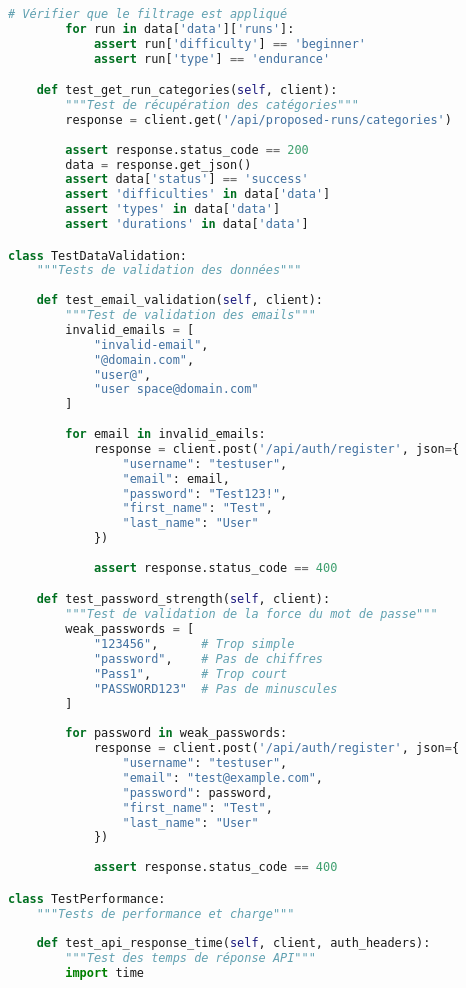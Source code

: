 \begin{lstlisting}[language=python, caption=Suite de tests API complète]
        # Vérifier que le filtrage est appliqué
        for run in data['data']['runs']:
            assert run['difficulty'] == 'beginner'
            assert run['type'] == 'endurance'

    def test_get_run_categories(self, client):
        """Test de récupération des catégories"""
        response = client.get('/api/proposed-runs/categories')
        
        assert response.status_code == 200
        data = response.get_json()
        assert data['status'] == 'success'
        assert 'difficulties' in data['data']
        assert 'types' in data['data']
        assert 'durations' in data['data']

class TestDataValidation:
    """Tests de validation des données"""
    
    def test_email_validation(self, client):
        """Test de validation des emails"""
        invalid_emails = [
            "invalid-email",
            "@domain.com",
            "user@",
            "user space@domain.com"
        ]
        
        for email in invalid_emails:
            response = client.post('/api/auth/register', json={
                "username": "testuser",
                "email": email,
                "password": "Test123!",
                "first_name": "Test",
                "last_name": "User"
            })
            
            assert response.status_code == 400

    def test_password_strength(self, client):
        """Test de validation de la force du mot de passe"""
        weak_passwords = [
            "123456",      # Trop simple
            "password",    # Pas de chiffres
            "Pass1",       # Trop court
            "PASSWORD123"  # Pas de minuscules
        ]
        
        for password in weak_passwords:
            response = client.post('/api/auth/register', json={
                "username": "testuser",
                "email": "test@example.com",
                "password": password,
                "first_name": "Test",
                "last_name": "User"
            })
            
            assert response.status_code == 400

class TestPerformance:
    """Tests de performance et charge"""
    
    def test_api_response_time(self, client, auth_headers):
        """Test des temps de réponse API"""
        import time
        

\end{lstlisting}
